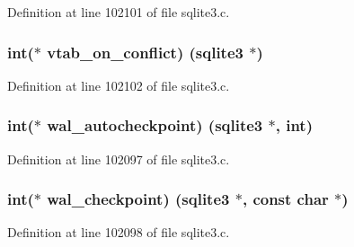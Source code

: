 Definition at line 102101 of file sqlite3.\+c.

\hypertarget{structsqlite3__api__routines_abe082a65a65f2b458dc2a90e04f6401a}{}
\subsubsection[{vtab\+\_\+on\+\_\+conflict}]{\setlength{\rightskip}{0pt plus 5cm}int($\ast$ vtab\+\_\+on\+\_\+conflict) ({\bf sqlite3} $\ast$)}\label{structsqlite3__api__routines_abe082a65a65f2b458dc2a90e04f6401a}


Definition at line 102102 of file sqlite3.\+c.

\hypertarget{structsqlite3__api__routines_ae0a51f393afbd3c36fefa2ad121fffa4}{}
\subsubsection[{wal\+\_\+autocheckpoint}]{\setlength{\rightskip}{0pt plus 5cm}int($\ast$ wal\+\_\+autocheckpoint) ({\bf sqlite3} $\ast$, int)}\label{structsqlite3__api__routines_ae0a51f393afbd3c36fefa2ad121fffa4}


Definition at line 102097 of file sqlite3.\+c.

\hypertarget{structsqlite3__api__routines_a1c989ac9fcf949d52270282a38b5d5db}{}
\subsubsection[{wal\+\_\+checkpoint}]{\setlength{\rightskip}{0pt plus 5cm}int($\ast$ wal\+\_\+checkpoint) ({\bf sqlite3} $\ast$, const char $\ast$)}\label{structsqlite3__api__routines_a1c989ac9fcf949d52270282a38b5d5db}


Definition at line 102098 of file sqlite3.\+c.

\hypertarget{structsqlite3__api__routines_aad374c8fe2ba7b9ffa27a33ce46433a9}{}
